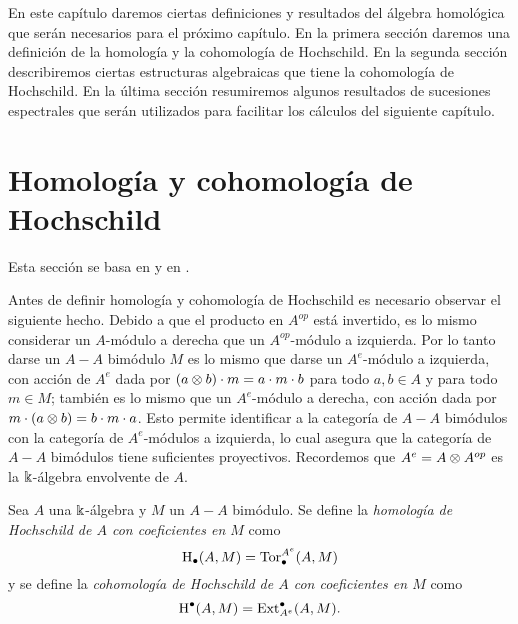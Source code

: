 \documentclass[a4paper,oneside,fleqn,11pt,../tesis.tex]{subfiles}
\begin{document}
En este capítulo daremos ciertas definiciones y resultados del álgebra homológica que serán necesarios
para el próximo capítulo. En la primera sección daremos una definición de la homología y la cohomología
de Hochschild. En la segunda sección describiremos ciertas estructuras algebraicas que tiene
la cohomología de Hochschild. En la última sección resumiremos algunos
resultados de sucesiones espectrales que serán utilizados para facilitar los cálculos del siguiente capítulo.

\section{Homología y cohomología de Hochschild}
Esta sección se basa en \cite{We} y en \cite{Gi}.

Antes de definir homología y cohomología de Hochschild es necesario observar el siguiente hecho.
Debido a que el producto en $A^{op}$ está invertido, es lo mismo considerar un $A$-módulo a derecha que un $A^{op}$-módulo a izquierda.
Por lo tanto darse un $A-A$ bimódulo $M$ es lo mismo que darse un $A^{e}$-módulo a izquierda, con acción de $A^e$
dada por $(a\otimes b)\cdot m = a\cdot m \cdot b$ para todo $a, b \in A$ y para todo $m \in M$; también es lo mismo que un $A^{e}$-módulo a derecha,
con acción dada por $m \cdot (a \otimes b) = b\cdot m \cdot a$.
Esto permite identificar a la categoría de $A-A$ bimódulos con la categoría de $A^e$-módulos a izquierda,
lo cual asegura que la categoría de $A-A$ bimódulos tiene suficientes proyectivos. Recordemos
que $A^e = A\otimes A^{op}$ es la $\Bbbk$-álgebra envolvente de $A$.

\begin{definition}
	Sea $A$ una $\Bbbk$-álgebra y $M$ un $A-A$ bimódulo. Se define la \emph{homología de Hochschild de $A$ con coeficientes en $M$} como
		\[
			\operatorname{H}_{\bullet}(A,M) = \operatorname{Tor}_{\bullet}^{A^e}(A, M)	
		\]
	y se define la \emph{cohomología de Hochschild de $A$ con coeficientes en $M$} como
	\[
			\operatorname{H}^{\bullet}(A,M) = \operatorname{Ext}^{\bullet}_{A^e}(A, M).	
	\]
\end{definition}
\end{document}
